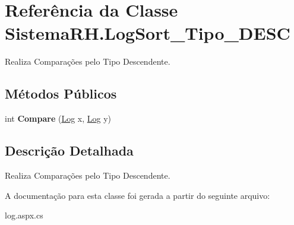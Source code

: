 \hypertarget{class_sistema_r_h_1_1_log_sort___tipo___d_e_s_c}{
\section{Referência da Classe SistemaRH.LogSort\_\-Tipo\_\-DESC}
\label{class_sistema_r_h_1_1_log_sort___tipo___d_e_s_c}
}


Realiza Comparações pelo Tipo Descendente.  


\subsection*{Métodos Públicos}
\begin{DoxyCompactItemize}
\item 
\hypertarget{class_sistema_r_h_1_1_log_sort___tipo___d_e_s_c_aafc7720288fdd8da581ff4c5a2526485}{
int {\bfseries Compare} (\hyperlink{class_sistema_r_h_1_1_log}{Log} x, \hyperlink{class_sistema_r_h_1_1_log}{Log} y)}
\label{class_sistema_r_h_1_1_log_sort___tipo___d_e_s_c_aafc7720288fdd8da581ff4c5a2526485}

\end{DoxyCompactItemize}


\subsection{Descrição Detalhada}
Realiza Comparações pelo Tipo Descendente. 

A documentação para esta classe foi gerada a partir do seguinte arquivo:\begin{DoxyCompactItemize}
\item 
log.aspx.cs\end{DoxyCompactItemize}
